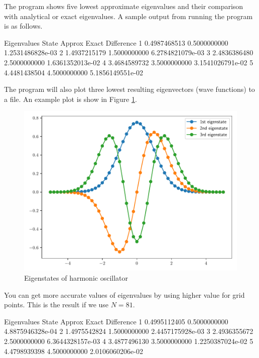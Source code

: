 The program shows five lowest approximate eigenvalues and their comparison with analytical or
exact eigenvalues. A sample output from running the program is as follows.
\begin{textcode}
Eigenvalues
State         Approx              Exact          Difference
   1       0.4987468513       0.5000000000   1.2531486828e-03
   2       1.4937215179       1.5000000000   6.2784821079e-03
   3       2.4836386480       2.5000000000   1.6361352013e-02
   4       3.4684589732       3.5000000000   3.1541026791e-02
   5       4.4481438504       4.5000000000   5.1856149551e-02 
\end{textcode}

The program will also plot three lowest resulting eigenvectors (wave functions) to a file.
An example plot is show in Figure \ref{fig:wfn_harm_01_51}.

\begin{figure}[H]
{\center
\includegraphics[scale=0.65]{../codes/sch_1d/IMG_main_harmonic_01_51.pdf}
\par}
\caption{Eigenstates of harmonic oscillator}
\label{fig:wfn_harm_01_51}
\end{figure}

You can get more accurate values of eigenvalues by using higher value for grid points.
This is the result if we use $N=81$.
\begin{textcode}
Eigenvalues
State         Approx              Exact          Difference
   1       0.4995112405       0.5000000000   4.8875946328e-04
   2       1.4975542824       1.5000000000   2.4457175928e-03
   3       2.4936355672       2.5000000000   6.3644328157e-03
   4       3.4877496130       3.5000000000   1.2250387024e-02
   5       4.4798939398       4.5000000000   2.0106060206e-02 
\end{textcode}


